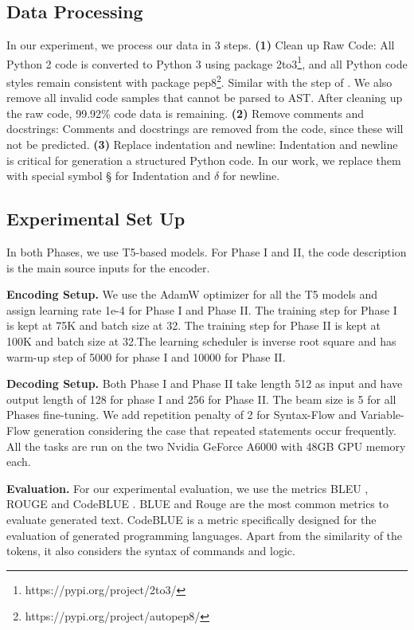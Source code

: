 \documentclass[11pt]{article}
\begin{document}
\subsection{Data Processing}
In our experiment, we process our data in 3 steps. \textbf{(1)} Clean up Raw Code: All Python 2 code is converted to Python 3 using package 2to3\footnote{https://pypi.org/project/2to3/}, and all Python code styles remain consistent with package pep8\footnote{https://pypi.org/project/autopep8/}. Similar with the step of \cite{Clement2020PyMT5MT}. We also remove all invalid code samples that cannot be parsed to AST. After cleaning up the raw code, 99.92\% code data is remaining. \textbf{(2)} Remove comments and docstrings: Comments and docstrings are removed from the code, since these will not be predicted. \textbf{(3)} Replace indentation and newline: Indentation and newline is critical for generation a structured Python code. In our work, we replace them with special symbol § for Indentation and $\delta$ for newline.


\subsection{Experimental Set Up}

In both Phases, we use T5-based models. For Phase I and II, the code description is the main source inputs for the encoder. 

\textbf{Encoding Setup.} We use the AdamW optimizer for all the T5 models and assign learning rate 1e-4 for Phase I and Phase II. The training step for Phase I is kept at 75K and batch size at 32.  The training step for Phase II is kept at 100K and batch size at 32.The learning scheduler is inverse root square and has warm-up step of 5000 for phase I and 10000 for Phase II.

\textbf{Decoding Setup.} Both Phase I and Phase II take length 512 as input and have output length of 128 for phase I and 256 for Phase II. The beam size is 5 for all Phases fine-tuning.
We add repetition penalty of 2 for Syntax-Flow and Variable-Flow generation considering the case that repeated statements occur frequently.
All the tasks are run on the two Nvidia GeForce A6000 with 48GB GPU memory each. 




\textbf{Evaluation.} For our experimental evaluation, we use the metrics BLEU \citep{Papineni02bleu:a}, ROUGE \citep{Lin2004ROUGEAP} and CodeBLUE \citep{Ren2020CodeBLEUAM}. BLUE and Rouge are the most common metrics to evaluate generated text. CodeBLUE is a metric specifically designed for the evaluation of generated programming languages. Apart from the similarity of the tokens, it also considers the syntax of commands and logic.
\end{document}
